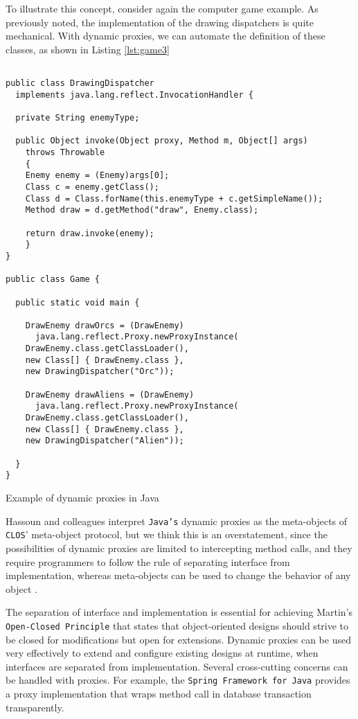 To illustrate this concept, consider again the computer game example. As previously noted, the implementation of the drawing dispatchers
is quite mechanical. With dynamic proxies, we can automate the definition of these classes, as shown in Listing \ref{lst:game3}

\begin{listing}[H]
\begin{verbatim}

public class DrawingDispatcher 
  implements java.lang.reflect.InvocationHandler {
  
  private String enemyType;
  
  public Object invoke(Object proxy, Method m, Object[] args)
	throws Throwable
    {
	Enemy enemy = (Enemy)args[0];
	Class c = enemy.getClass();    
	Class d = Class.forName(this.enemyType + c.getSimpleName());    
	Method draw = d.getMethod("draw", Enemy.class);
	
	return draw.invoke(enemy);
    }
}

public class Game {

  public static void main {
  
    DrawEnemy drawOrcs = (DrawEnemy)
      java.lang.reflect.Proxy.newProxyInstance(
	DrawEnemy.class.getClassLoader(),
	new Class[] { DrawEnemy.class },
	new DrawingDispatcher("Orc"));
					
    DrawEnemy drawAliens = (DrawEnemy)
      java.lang.reflect.Proxy.newProxyInstance(
	DrawEnemy.class.getClassLoader(),
	new Class[] { DrawEnemy.class },
	new DrawingDispatcher("Alien"));
    
  }
}
\end{verbatim}
\caption{Example of dynamic proxies in Java}
\label{lst:game3}
\end{listing}

Hassoun and colleagues interpret \texttt{Java's} dynamic proxies as the meta-objects of \texttt{CLOS}' meta-object protocol, but
we think this is an overstatement, since the possibilities of dynamic proxies are limited to intercepting method calls, and
they require programmers to follow the rule of separating interface from implementation, whereas meta-objects can
be used to change the behavior of any object \cite{Hassoun03, Hassoun05}. 

The separation of interface and implementation is essential for achieving Martin's \texttt{Open-Closed Principle} that states
that object-oriented designs should strive to be closed for modifications but open for extensions. Dynamic proxies can
be used very effectively to extend and configure existing designs at runtime, when interfaces are separated from implementation.
Several cross-cutting concerns can be handled with proxies. For example, the \texttt{Spring Framework for Java} provides a
proxy implementation that wraps method call in database transaction transparently.

